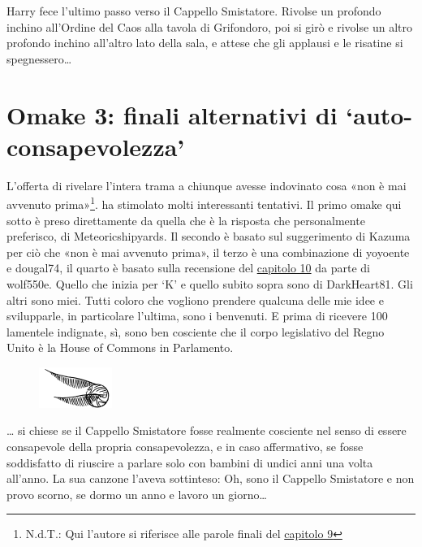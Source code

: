 Harry fece l’ultimo passo verso il Cappello Smistatore. Rivolse un profondo inchino all’Ordine del Caos alla tavola di Grifondoro, poi si girò e rivolse un altro profondo inchino all’altro lato della sala, e attese che gli applausi e le risatine si spegnessero…



\section*{Omake 3: finali alternativi di ‘auto-consapevolezza’}

\vspace{1em}
\begin{addmargin}[3em]{3em}%
\begin{itpars}
L’offerta di rivelare l’intera trama a chiunque avesse indovinato cosa «non è mai avvenuto prima»\footnote{N.d.T.: Qui l’autore si riferisce alle parole finali del \hyperref[capitolo:9]{capitolo 9}}. ha stimolato molti interessanti tentativi. Il primo omake qui sotto è preso direttamente da quella che è la risposta che personalmente preferisco, di Meteoricshipyards. Il secondo è basato sul suggerimento di Kazuma per ciò che «non è mai avvenuto prima», il terzo è una combinazione di yoyoente e dougal74, il quarto è basato sulla recensione del \hyperref[capitolo:10]{capitolo 10} da parte di wolf550e. Quello che inizia per ‘K’ e quello subito sopra sono di DarkHeart81. Gli altri sono miei. Tutti coloro che vogliono prendere qualcuna delle mie idee e svilupparle, in particolare l’ultima, sono i benvenuti. E prima di ricevere 100 lamentele indignate, sì, sono ben cosciente che il corpo legislativo del Regno Unito è la House of Commons in Parlamento.
\end{itpars}
\end{addmargin}
\vspace{1em}


\begin{figure}[h]
	\includegraphics[scale=0.4]{boccino.png}
	\centering
\end{figure}

… si chiese se il Cappello Smistatore fosse realmente cosciente nel senso di essere consapevole della propria consapevolezza, e in caso affermativo, se fosse soddisfatto di riuscire a parlare solo con bambini di undici anni una volta all’anno. La sua canzone l’aveva sottinteso: Oh, sono il Cappello Smistatore e non provo scorno, se dormo un anno e lavoro un giorno…

